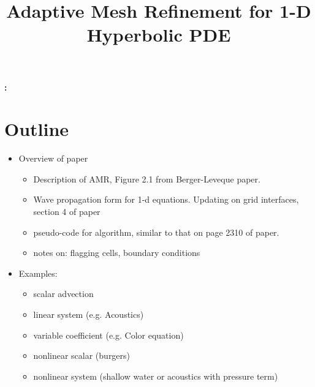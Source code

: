 \documentclass[12pt]{article}
\begin{document}
\title{\bf Adaptive Mesh Refinement for 1-D Hyperbolic PDE}
\author{}
\maketitle


{\bf \abstractname{:}} {\small}

\section{Outline}
\begin{itemize}
\item Overview of paper
\begin{itemize}
\item Description of AMR, Figure 2.1 from Berger-Leveque paper.
\item Wave propagation form for 1-d equations. Updating on grid interfaces, section 4 of paper
\item pseudo-code for algorithm, similar to that on page 2310 of paper.
\item notes on: flagging cells, boundary conditions
\end{itemize}
\item Examples:
\begin{itemize}
\item scalar advection
\item linear system (e.g. Acoustics)
\item variable coefficient (e.g. Color equation)
\item nonlinear scalar (burgers)
\item nonlinear system (shallow water or acoustics with pressure term)
\end{itemize}


\end{itemize}
\end{document}
